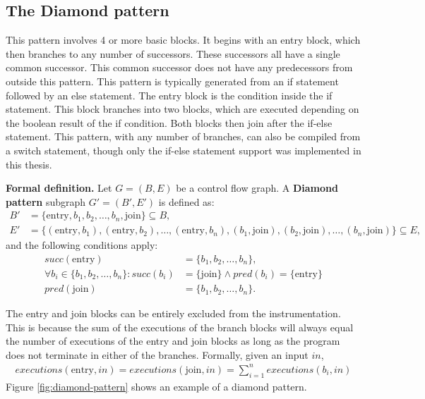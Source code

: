 \subsection{The Diamond pattern}

This pattern involves 4 or more basic blocks. It begins with an entry block, which then branches to any number of successors. These successors all have a single common successor. This common successor does not have any predecessors from outside this pattern. This pattern is typically generated from an if statement followed by an else statement. The entry block is the condition inside the if statement. This block branches into two blocks, which are executed depending on the boolean result of the if condition. Both blocks then join after the if-else statement. This pattern, with any number of branches, can also be compiled from a switch statement, though only the if-else statement support was implemented in this thesis.


\textbf{Formal definition.} Let \( G = (B, E) \) be a control flow graph. A \textbf{Diamond pattern} subgraph \( G' = (B', E') \) is defined as:
\begin{align}
    B' &= \{\text{entry}, b_1, b_2, \ldots, b_n, \text{join}\} \subseteq B, \\
    E' &= \{(\text{entry}, b_1), (\text{entry}, b_2), \ldots, (\text{entry}, b_n), (b_1, \text{join}), (b_2, \text{join}), \ldots, (b_n, \text{join})\} \subseteq E,
\end{align}
and the following conditions apply:
\begin{align}
succ(\text{entry}) &= \{b_1, b_2, \ldots, b_n\}, \\
\forall b_i \in \{b_1, b_2, \ldots, b_n\}:  
succ(b_i) &= \{\text{join}\} \land pred(b_i) = \{\text{entry}\}\\
pred(\text{join}) &= \{b_1, b_2, \ldots, b_n\}.
\end{align}


The entry and join blocks can be entirely excluded from the instrumentation. This is because the sum of the executions of the branch blocks will always equal the number of executions of the entry and join blocks as long as the program does not terminate in either of the branches. Formally, given an input \(in\),
\begin{align}
executions(\text{entry}, in) = executions(\text{join}, in) = \sum_{i=1}^{n} executions(b_i, in)
\end{align}
Figure \ref{fig:diamond-pattern} shows an example of a diamond pattern.

